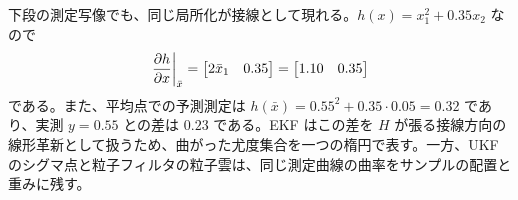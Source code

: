 下段の測定写像でも、同じ局所化が接線として現れる。$h(x)=x_1^2+0.35x_2$ なので
\begin{equation}
  \left.\frac{\partial h}{\partial x}\right|_{\bar{x}}
  =
  \begin{bmatrix}
    2\bar{x}_1&0.35
  \end{bmatrix}
  =
  \begin{bmatrix}
    1.10&0.35
  \end{bmatrix}
\end{equation}
である。また、平均点での予測測定は $h(\bar{x})=0.55^2+0.35\cdot0.05=0.32$ であり、実測 $y=0.55$ との差は $0.23$ である。EKF はこの差を $H$ が張る接線方向の線形革新として扱うため、曲がった尤度集合を一つの楕円で表す。一方、UKF のシグマ点と粒子フィルタの粒子雲は、同じ測定曲線の曲率をサンプルの配置と重みに残す。
